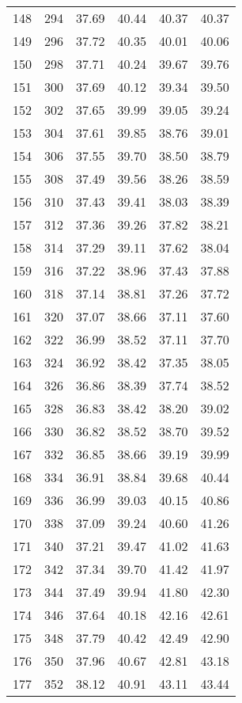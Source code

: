 \begin{longtable}{rrllll}
		148 & 294 & 37.69 & 40.44 & 40.37 & 40.37 \\ 
		149 & 296 & 37.72 & 40.35 & 40.01 & 40.06 \\ 
		150 & 298 & 37.71 & 40.24 & 39.67 & 39.76 \\ 
		151 & 300 & 37.69 & 40.12 & 39.34 & 39.50 \\ 
		152 & 302 & 37.65 & 39.99 & 39.05 & 39.24 \\ 
		153 & 304 & 37.61 & 39.85 & 38.76 & 39.01 \\ 
		154 & 306 & 37.55 & 39.70 & 38.50 & 38.79 \\ 
		155 & 308 & 37.49 & 39.56 & 38.26 & 38.59 \\ 
		156 & 310 & 37.43 & 39.41 & 38.03 & 38.39 \\ 
		157 & 312 & 37.36 & 39.26 & 37.82 & 38.21 \\ 
		158 & 314 & 37.29 & 39.11 & 37.62 & 38.04 \\ 
		159 & 316 & 37.22 & 38.96 & 37.43 & 37.88 \\ 
		160 & 318 & 37.14 & 38.81 & 37.26 & 37.72 \\ 
		161 & 320 & 37.07 & 38.66 & 37.11 & 37.60 \\ 
		162 & 322 & 36.99 & 38.52 & 37.11 & 37.70 \\ 
		163 & 324 & 36.92 & 38.42 & 37.35 & 38.05 \\ 
		164 & 326 & 36.86 & 38.39 & 37.74 & 38.52 \\ 
		165 & 328 & 36.83 & 38.42 & 38.20 & 39.02 \\ 
		166 & 330 & 36.82 & 38.52 & 38.70 & 39.52 \\ 
		167 & 332 & 36.85 & 38.66 & 39.19 & 39.99 \\ 
		168 & 334 & 36.91 & 38.84 & 39.68 & 40.44 \\ 
		169 & 336 & 36.99 & 39.03 & 40.15 & 40.86 \\ 
		170 & 338 & 37.09 & 39.24 & 40.60 & 41.26 \\ 
		171 & 340 & 37.21 & 39.47 & 41.02 & 41.63 \\ 
		172 & 342 & 37.34 & 39.70 & 41.42 & 41.97 \\ 
		173 & 344 & 37.49 & 39.94 & 41.80 & 42.30 \\ 
		174 & 346 & 37.64 & 40.18 & 42.16 & 42.61 \\ 
		175 & 348 & 37.79 & 40.42 & 42.49 & 42.90 \\ 
		176 & 350 & 37.96 & 40.67 & 42.81 & 43.18 \\ 
		177 & 352 & 38.12 & 40.91 & 43.11 & 43.44 \\ 

\end{longtable}
